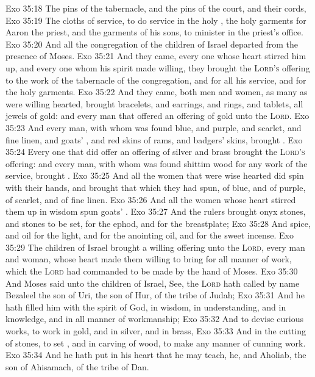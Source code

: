\vs Exo 35:18 The pins of the tabernacle, and the pins of the court, and their cords,
\vs Exo 35:19 The cloths of service, to do service in the holy , the holy garments for Aaron the priest, and the garments of his sons, to minister in the priest's office.
\vs Exo 35:20 And all the congregation of the children of Israel departed from the presence of Moses.
\vs Exo 35:21 And they came, every one whose heart stirred him up, and every one whom his spirit made willing,  they brought the \textsc{Lord's} offering to the work of the tabernacle of the congregation, and for all his service, and for the holy garments.
\vs Exo 35:22 And they came, both men and women, as many as were willing hearted,  brought bracelets, and earrings, and rings, and tablets, all jewels of gold: and every man that offered  an offering of gold unto the \textsc{Lord}.
\vs Exo 35:23 And every man, with whom was found blue, and purple, and scarlet, and fine linen, and goats' , and red skins of rams, and badgers' skins, brought .
\vs Exo 35:24 Every one that did offer an offering of silver and brass brought the \textsc{Lord's} offering: and every man, with whom was found shittim wood for any work of the service, brought .
\vs Exo 35:25 And all the women that were wise hearted did spin with their hands, and brought that which they had spun,  of blue, and of purple,  of scarlet, and of fine linen.
\vs Exo 35:26 And all the women whose heart stirred them up in wisdom spun goats' .
\vs Exo 35:27 And the rulers brought onyx stones, and stones to be set, for the ephod, and for the breastplate;
\vs Exo 35:28 And spice, and oil for the light, and for the anointing oil, and for the sweet incense.
\vs Exo 35:29 The children of Israel brought a willing offering unto the \textsc{Lord}, every man and woman, whose heart made them willing to bring for all manner of work, which the \textsc{Lord} had commanded to be made by the hand of Moses.
\vs Exo 35:30 And Moses said unto the children of Israel, See, the \textsc{Lord} hath called by name Bezaleel the son of Uri, the son of Hur, of the tribe of Judah;
\vs Exo 35:31 And he hath filled him with the spirit of God, in wisdom, in understanding, and in knowledge, and in all manner of workmanship;
\vs Exo 35:32 And to devise curious works, to work in gold, and in silver, and in brass,
\vs Exo 35:33 And in the cutting of stones, to set , and in carving of wood, to make any manner of cunning work.
\vs Exo 35:34 And he hath put in his heart that he may teach,  he, and Aholiab, the son of Ahisamach, of the tribe of Dan.
